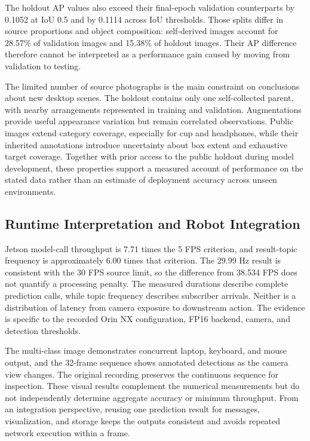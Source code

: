 \documentclass[12pt,a4paper]{article}
\begin{document}
The holdout AP values also exceed their final-epoch validation counterparts by 0.1052 at IoU 0.5 and by 0.1114 across IoU thresholds. Those splits differ in source proportions and object composition: self-derived images account for 28.57\% of validation images and 15.38\% of holdout images. Their AP difference therefore cannot be interpreted as a performance gain caused by moving from validation to testing.

The limited number of source photographs is the main constraint on conclusions about new desktop scenes. The holdout contains only one self-collected parent, with nearby arrangements represented in training and validation. Augmentations provide useful appearance variation but remain correlated observations. Public images extend category coverage, especially for cup and headphones, while their inherited annotations introduce uncertainty about box extent and exhaustive target coverage. Together with prior access to the public holdout during model development, these properties support a measured account of performance on the stated data rather than an estimate of deployment accuracy across unseen environments.

\FloatBarrier
\subsection{Runtime Interpretation and Robot Integration}

Jetson model-call throughput is 7.71 times the 5 FPS criterion, and result-topic frequency is approximately 6.00 times that criterion. The 29.99 Hz result is consistent with the 30 FPS source limit, so the difference from 38.534 FPS does not quantify a processing penalty. The measured durations describe complete prediction calls, while topic frequency describes subscriber arrivals. Neither is a distribution of latency from camera exposure to downstream action. The evidence is specific to the recorded Orin NX configuration, FP16 backend, camera, and detection thresholds.

The multi-class image demonstrates concurrent laptop, keyboard, and mouse output, and the 32-frame sequence shows annotated detections as the camera view changes. The original recording preserves the continuous sequence for inspection. These visual results complement the numerical measurements but do not independently determine aggregate accuracy or minimum throughput. From an integration perspective, reusing one prediction result for messages, visualization, and storage keeps the outputs consistent and avoids repeated network execution within a frame.
\end{document}
